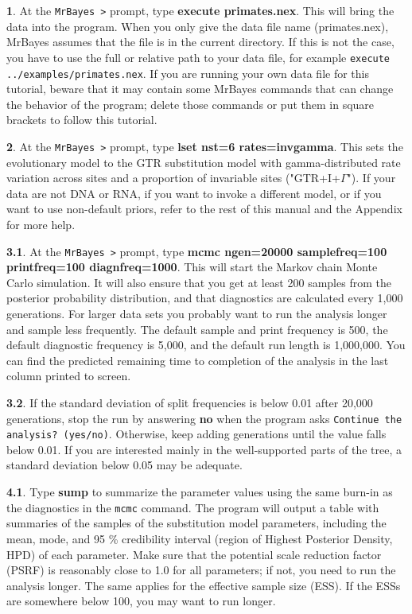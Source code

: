 \documentclass[12pt]{book}
\begin{document}
\textbf{1}. At the \texttt{MrBayes >} prompt, type \textbf{execute primates.nex}. This will bring
the data into the program. When you only give the data file name (primates.nex), MrBayes assumes
that the file is in the current directory. If this is not the case, you have to use the full or
relative path to your data file, for example \texttt{execute ../examples/primates.nex}. If you are
running your own data file for this tutorial, beware that it may contain some MrBayes commands that
can change the behavior of the program; delete those commands or put them in square brackets to
follow this tutorial. 

\textbf{2}. At the \texttt{MrBayes >} prompt, type \textbf{lset nst=6 rates=invgamma}. This sets
the evolutionary model to the GTR substitution model with gamma-distributed rate variation across
sites and a proportion of invariable sites ("GTR+I+$\Gamma$"). If your data are not DNA or RNA, if
you want to invoke a different model, or if you want to use non-default priors, refer to the rest
of this manual and the Appendix for more help.

\textbf{3.1}. At the \texttt{MrBayes >} prompt, type \textbf{mcmc ngen=20000 samplefreq=100
printfreq=100 diagnfreq=1000}. This will start the Markov chain Monte Carlo simulation. It will
also ensure that you get at least 200 samples from the posterior probability distribution, and that
diagnostics are calculated every 1,000 generations. For larger data sets you probably want to run
the analysis longer and sample less frequently. The default sample and print frequency is 500, the
default diagnostic frequency is 5,000, and the default run length is 1,000,000. You can find the
predicted remaining time to completion of the analysis in the last column printed to screen.

\textbf{3.2}. If the standard deviation of split frequencies is below 0.01 after 20,000
generations, stop the run by answering \textbf{no} when the program asks \texttt{Continue the
analysis? (yes/no)}.  Otherwise, keep adding generations until the value falls below 0.01. If you
are interested mainly in the well-supported parts of the tree, a standard deviation below 0.05 may
be adequate.

\textbf{4.1}. Type \textbf{sump} to summarize the parameter values using the same burn-in as the
diagnostics in the \texttt{mcmc} command. The program will output a table with summaries of the
samples of the substitution model parameters, including the mean, mode, and 95 \% credibility
interval (region of Highest Posterior Density, HPD) of each parameter. Make sure that the potential
scale reduction factor (PSRF) is reasonably close to 1.0 for all parameters; if not, you need to
run the analysis longer.  The same applies for the effective sample size (ESS). If the ESSs are
somewhere below 100, you may want to run longer.
\end{document}
